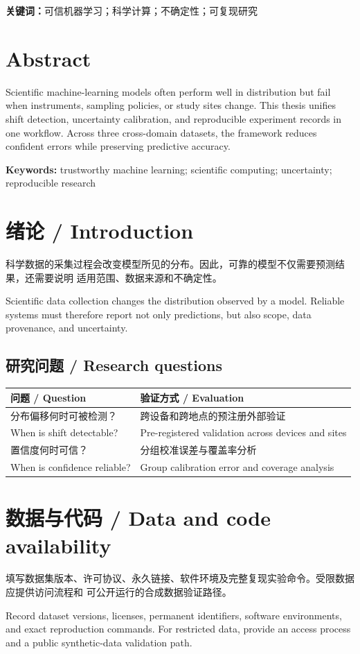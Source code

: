 \documentclass[UTF8,11pt,oneside,fontset=fandol]{ctexbook}
\begin{document}
\noindent\textbf{关键词：}可信机器学习；科学计算；不确定性；可复现研究

\chapter*{Abstract}
Scientific machine-learning models often perform well in distribution but fail
when instruments, sampling policies, or study sites change. This thesis unifies
shift detection, uncertainty calibration, and reproducible experiment records
in one workflow. Across three cross-domain datasets, the framework reduces
confident errors while preserving predictive accuracy.

\noindent\textbf{Keywords:} trustworthy machine learning; scientific computing;
uncertainty; reproducible research

\tableofcontents

\mainmatter
\chapter{绪论 / Introduction}
科学数据的采集过程会改变模型所见的分布。因此，可靠的模型不仅需要预测结果，还需要说明
适用范围、数据来源和不确定性。

Scientific data collection changes the distribution observed by a model.
Reliable systems must therefore report not only predictions, but also scope,
data provenance, and uncertainty.

\section{研究问题 / Research questions}
\begin{tabularx}{\textwidth}{@{}lX@{}}
\toprule
\textbf{问题 / Question} & \textbf{验证方式 / Evaluation} \\
\midrule
分布偏移何时可被检测？ & 跨设备和跨地点的预注册外部验证 \\
When is shift detectable? & Pre-registered validation across devices and sites \\
置信度何时可信？ & 分组校准误差与覆盖率分析 \\
When is confidence reliable? & Group calibration error and coverage analysis \\
\bottomrule
\end{tabularx}

\backmatter
\chapter*{数据与代码 / Data and code availability}
填写数据集版本、许可协议、永久链接、软件环境及完整复现实验命令。受限数据应提供访问流程和
可公开运行的合成数据验证路径。

Record dataset versions, licenses, permanent identifiers, software
environments, and exact reproduction commands. For restricted data, provide an
access process and a public synthetic-data validation path.
\end{document}
